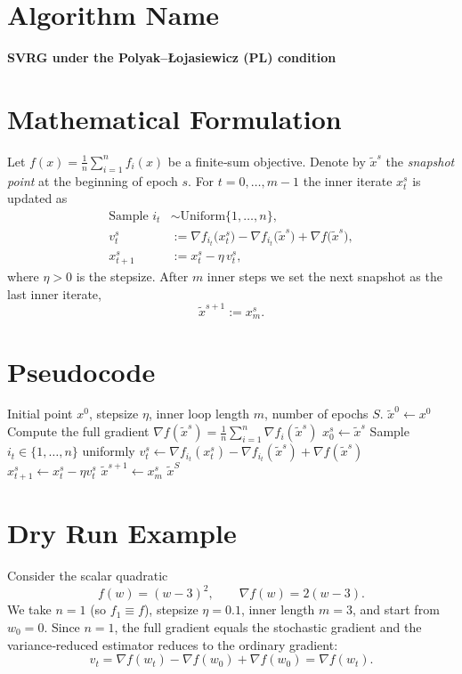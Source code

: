 \documentclass{article}
\begin{document}
\section*{Algorithm Name}
\textbf{SVRG under the Polyak–\L{}ojasiewicz (PL) condition}

\section*{Mathematical Formulation}
Let $f(x)=\frac{1}{n}\sum_{i=1}^{n}f_i(x)$ be a finite‑sum objective.  
Denote by $\tilde{x}^{s}$ the \emph{snapshot point} at the beginning of epoch $s$.  
For $t=0,\dots ,m-1$ the inner iterate $x_{t}^{s}$ is updated as
\[
\boxed{
\begin{aligned}
\text{Sample }i_t &\sim \text{Uniform}\{1,\dots ,n\},\\[0.2em]
v_{t}^{s} &:= \nabla f_{i_t}\!\bigl(x_{t}^{s}\bigr)-\nabla f_{i_t}\!\bigl(\tilde{x}^{s}\bigr)+\nabla f\!\bigl(\tilde{x}^{s}\bigr),\\[0.2em]
x_{t+1}^{s} &:= x_{t}^{s}-\eta\, v_{t}^{s},
\end{aligned}}
\]
where $\eta>0$ is the stepsize.  
After $m$ inner steps we set the next snapshot as the last inner iterate,
\[
\tilde{x}^{s+1}:=x_{m}^{s}.
\]

\section*{Pseudocode}
\begin{algorithm}[H]
\caption{SVRG under PL}
\begin{algorithmic}[1]
\REQUIRE Initial point $x^{0}$, stepsize $\eta$, inner loop length $m$, number of epochs $S$.
\STATE $\tilde{x}^{0}\leftarrow x^{0}$
    \STATE Compute the full gradient $\nabla f(\tilde{x}^{s})=\frac1n\sum_{i=1}^{n}\nabla f_i(\tilde{x}^{s})$
    \STATE $x_{0}^{s}\leftarrow \tilde{x}^{s}$
        \STATE Sample $i_t\in\{1,\dots ,n\}$ uniformly
        \STATE $v_{t}^{s}\leftarrow \nabla f_{i_t}(x_{t}^{s})-\nabla f_{i_t}(\tilde{x}^{s})+\nabla f(\tilde{x}^{s})$
        \STATE $x_{t+1}^{s}\leftarrow x_{t}^{s}-\eta v_{t}^{s}$
    \ENDFOR
    \STATE $\tilde{x}^{s+1}\leftarrow x_{m}^{s}$
\ENDFOR
\RETURN $\tilde{x}^{S}$
\end{algorithmic}
\end{algorithm}

\section*{Dry Run Example}
Consider the scalar quadratic
\[
f(w)=(w-3)^{2},\qquad \nabla f(w)=2(w-3).
\]
We take $n=1$ (so $f_1\equiv f$), stepsize $\eta=0.1$, inner length $m=3$, and start from $w_{0}=0$.
Since $n=1$, the full gradient equals the stochastic gradient and the variance‑reduced estimator reduces to the ordinary gradient:
\[
v_t = \nabla f(w_t)-\nabla f(w_0)+\nabla f(w_0)=\nabla f(w_t).
\]
\end{document}
